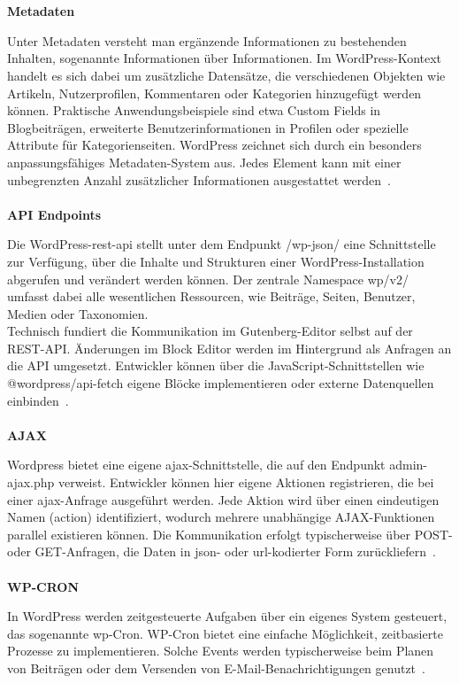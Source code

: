 \\
\\
\textbf{Metadaten}

Unter Metadaten versteht man ergänzende Informationen zu bestehenden Inhalten, sogenannte \grqq{}Informationen über Informationen\grqq{}.
Im WordPress-Kontext handelt es sich dabei um zusätzliche Datensätze, die verschiedenen Objekten wie Artikeln, Nutzerprofilen, Kommentaren oder Kategorien hinzugefügt werden können.
Praktische Anwendungsbeispiele sind etwa Custom Fields in Blogbeiträgen, erweiterte Benutzerinformationen in Profilen oder spezielle Attribute für Kategorienseiten.
WordPress zeichnet sich durch ein besonders anpassungsfähiges Metadaten-System aus.
Jedes Element kann mit einer unbegrenzten Anzahl zusätzlicher Informationen ausgestattet werden~\cite{wordpress2024metadata}.
\\
\\
\textbf{API Endpoints}

Die WordPress-\gls{rest}-\gls{api} stellt unter dem Endpunkt /wp-json/ eine Schnittstelle zur Verfügung, über die Inhalte und Strukturen einer WordPress-Installation abgerufen und verändert werden können.
Der zentrale Namespace wp/v2/ umfasst dabei alle wesentlichen Ressourcen, wie Beiträge, Seiten, Benutzer, Medien oder Taxonomien.
\\
Technisch fundiert die Kommunikation im Gutenberg-Editor selbst auf der REST-API.
Änderungen im Block Editor werden im Hintergrund als Anfragen an die API umgesetzt.
Entwickler können über die JavaScript-Schnittstellen wie @wordpress/api-fetch eigene Blöcke implementieren oder externe Datenquellen einbinden~\cite{wordpress2024restApi}.
\\
\\
\textbf{AJAX}

Wordpress bietet eine eigene \gls{ajax}-Schnittstelle, die auf den Endpunkt admin-ajax.php verweist.
Entwickler können hier eigene Aktionen registrieren, die bei einer \gls{ajax}-Anfrage ausgeführt werden.
Jede Aktion wird über einen eindeutigen Namen (action) identifiziert, wodurch mehrere unabhängige AJAX-Funktionen parallel existieren können.
Die Kommunikation erfolgt typischerweise über POST- oder GET-Anfragen, die Daten in \gls{json}- oder \gls{url}-kodierter Form zurückliefern~\cite{wordpress2024Ajax}.
\\
\\
\textbf{WP-CRON}

In WordPress werden zeitgesteuerte Aufgaben über ein eigenes System gesteuert, das sogenannte \gls{wp}-Cron.
WP-Cron bietet eine einfache Möglichkeit, zeitbasierte Prozesse zu implementieren.
Solche Events werden typischerweise beim Planen von Beiträgen oder dem Versenden von E-Mail-Benachrichtigungen genutzt~\cite{wordpress2024Cron}.

